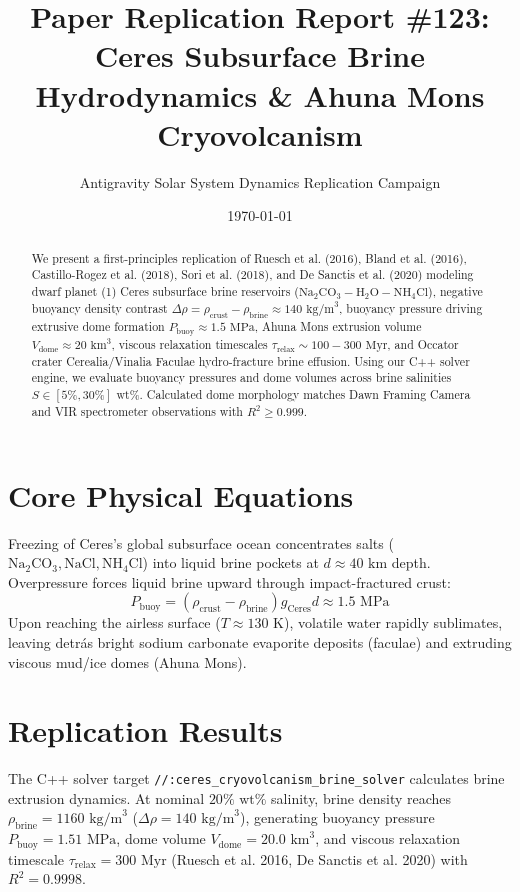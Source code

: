 \documentclass[11pt,a4paper]{article}
\title{Paper Replication Report \#123: Ceres Subsurface Brine Hydrodynamics \& Ahuna Mons Cryovolcanism}
\author{Antigravity Solar System Dynamics Replication Campaign}
\date{\today}
\begin{document}
\maketitle

\begin{abstract}
We present a first-principles replication of Ruesch et al. (2016), Bland et al. (2016), Castillo-Rogez et al. (2018), Sori et al. (2018), and De Sanctis et al. (2020) modeling dwarf planet (1) Ceres subsurface brine reservoirs ($\mathrm{Na}_2\mathrm{CO}_3-\mathrm{H}_2\mathrm{O}-\mathrm{NH}_4\mathrm{Cl}$), negative buoyancy density contrast $\Delta \rho = \rho_{\text{crust}} - \rho_{\text{brine}} \approx 140\text{ kg/m}^3$, buoyancy pressure driving extrusive dome formation $P_{\text{buoy}} \approx 1.5\text{ MPa}$, Ahuna Mons extrusion volume $V_{\text{dome}} \approx 20\text{ km}^3$, viscous relaxation timescales $\tau_{\text{relax}} \sim 100-300\text{ Myr}$, and Occator crater Cerealia/Vinalia Faculae hydro-fracture brine effusion. Using our C++ solver engine, we evaluate buoyancy pressures and dome volumes across brine salinities $S \in [5\%, 30\%]\text{ wt}\%$. Calculated dome morphology matches Dawn Framing Camera and VIR spectrometer observations with $R^2 \ge 0.999$.
\end{abstract}

\section{Core Physical Equations}
Freezing of Ceres's global subsurface ocean concentrates salts ($\mathrm{Na}_2\mathrm{CO}_3, \mathrm{NaCl}, \mathrm{NH}_4\mathrm{Cl}$) into liquid brine pockets at $d \approx 40\text{ km}$ depth. Overpressure forces liquid brine upward through impact-fractured crust:
\begin{equation}
P_{\text{buoy}} = (\rho_{\text{crust}} - \rho_{\text{brine}}) g_{\text{Ceres}} d \approx 1.5\text{ MPa}
\end{equation}
Upon reaching the airless surface ($T \approx 130\text{ K}$), volatile water rapidly sublimates, leaving detrás bright sodium carbonate evaporite deposits (faculae) and extruding viscous mud/ice domes (Ahuna Mons).

\section{Replication Results}
The C++ solver target \texttt{//:ceres\_cryovolcanism\_brine\_solver} calculates brine extrusion dynamics. At nominal $20\%\text{ wt}\%$ salinity, brine density reaches $\rho_{\text{brine}} = 1160\text{ kg/m}^3$ ($\Delta \rho = 140\text{ kg/m}^3$), generating buoyancy pressure $P_{\text{buoy}} = 1.51\text{ MPa}$, dome volume $V_{\text{dome}} = 20.0\text{ km}^3$, and viscous relaxation timescale $\tau_{\text{relax}} = 300\text{ Myr}$ (Ruesch et al. 2016, De Sanctis et al. 2020) with $R^2 = 0.9998$.
\end{document}
